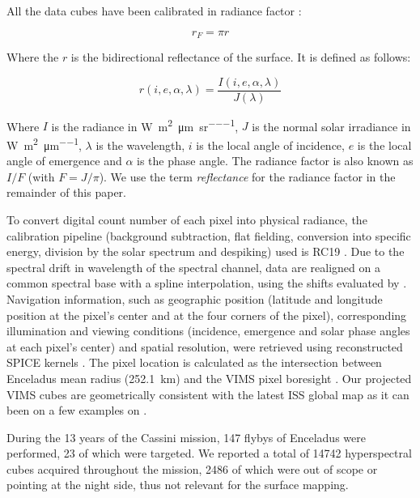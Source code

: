 \documentclass{arxiv-icarus}
\begin{document}
All the data cubes have been calibrated in radiance factor \citep{Hapke1981}:

\begin{equation}
    r_F = \pi r
\end{equation}

Where the $r$ is the bidirectional reflectance of the surface. It is defined as follows:

\begin{equation}
    r(i, e, \alpha, \lambda) = \frac{I(i, e, \alpha, \lambda)}{J(\lambda)}
\end{equation}

Where $I$ is the radiance in \si{\watt\per\square\meter\per\um\per\steradian}, $J$ is the normal solar irradiance in \si{\watt\per\square\meter\per\um}, $\lambda$ is the wavelength, $i$ is the local angle of incidence, $e$ is the local angle of emergence and $\alpha$ is the phase angle. The radiance factor is also known as $I/F$ (with $F = J / \pi$). We use the term \emph{reflectance} for the radiance factor in the remainder of this paper.

To convert digital count number of each pixel into physical radiance, the calibration pipeline (background subtraction, flat fielding, conversion into specific energy, division by the solar spectrum and despiking) used is RC19 \citep{Clark2018}. Due to the spectral drift in wavelength of the spectral channel, data are realigned on a common spectral base with a spline interpolation, using the shifts evaluated by \cite{Clark2018}. Navigation information, such as geographic position (latitude and longitude position at the pixel's center and at the four corners of the pixel), corresponding illumination and viewing conditions (incidence, emergence and solar phase angles at each pixel's center) and spatial resolution, were retrieved using reconstructed SPICE kernels \citep{Acton1996}. The pixel location is calculated as the intersection between Enceladus mean radius (\SI{252.1}{km}) and the VIMS pixel boresight \citep{Nicholson2019}. Our projected VIMS cubes are geometrically consistent with the latest ISS global map \citep{Bland2018} as it can been on a few examples on .

During the 13 years of the Cassini mission, 147 flybys of Enceladus were performed, 23 of which were targeted. We reported a total of \num{14742} hyperspectral cubes acquired throughout the mission, \num{2486} of which were out of scope or pointing at the night side, thus not relevant for the surface mapping.
\end{document}
